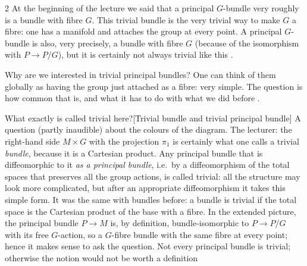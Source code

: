 \begin{paracol}{2}
At the beginning of the lecture we said that a principal $G$-bundle very roughly is a bundle with fibre $G$. This trivial bundle is the very trivial way to make $G$ a fibre: one has a manifold and attaches the group at every point. A principal $G$-bundle is also, very precisely, a bundle with fibre $G$ (because of the isomorphism with $P\to P/G$), but it is certainly not always trivial like this      .

Why are we interested in trivial principal bundles? One can think of them globally as having the group just attached as a fibre: very simple. The question is how common that is, and what it has to do with what we did before  .
\begin{answer}{What exactly is called trivial here?}[Trivial bundle and trivial principal bundle]
A question (partly inaudible) about the colours of the diagram. The lecturer: the right-hand side $M\times G$ with the projection $\pi_1$ is certainly what one calls a trivial \emph{bundle}, because it is a Cartesian product. Any principal bundle that is diffeomorphic to it \emph{as a principal bundle}, i.e.\ by a diffeomorphism of the total spaces that preserves all the group actions, is called trivial: all the structure may look more complicated, but after an appropriate diffeomorphism it takes this simple form. It was the same with bundles before: a bundle is trivial if the total space is the Cartesian product of the base with a fibre. In the extended picture, the principal bundle $P\to M$ is, by definition, bundle-isomorphic to $P\to P/G$ with its free $G$-action, so a $G$-fibre bundle with the same fibre at every point; hence it makes sense to ask the question. Not every principal bundle is trivial; otherwise the notion would not be worth a definition             
\end{answer}


\end{paracol}
